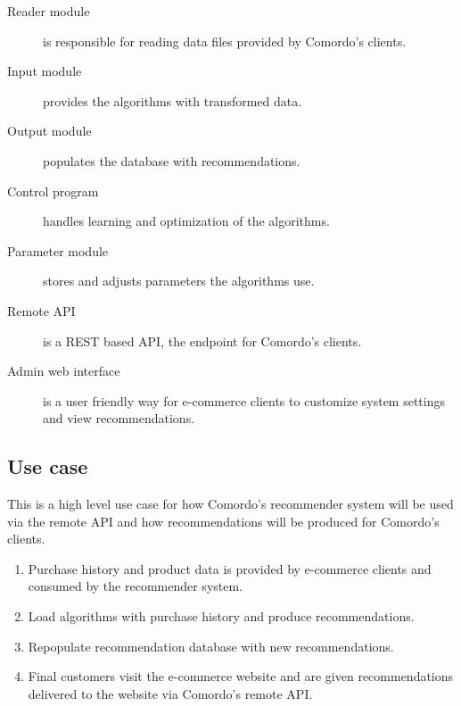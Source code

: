 \begin{description}
    \item[Reader module] is responsible for reading data files provided by Comordo's clients.
    \item[Input module] provides the algorithms with transformed data.
    \item[Output module] populates the database with recommendations.
    \item[Control program] handles learning and optimization of the algorithms.
    \item[Parameter module] stores and adjusts parameters the algorithms use.
    \item[Remote API] is a REST based API, the endpoint for Comordo's clients.
    \item[Admin web interface] is a user friendly way for e-commerce clients to customize system settings and view recommendations.
\end{description}


\subsection{Use case}\label{sec:use}

This is a high level use case for how Comordo's recommender system will be used via the remote API and how recommendations will be produced for Comordo's clients.

\begin{enumerate}
    \item Purchase history and product data is provided by e-commerce clients and consumed by the recommender system.
    \item Load algorithms with purchase history and produce recommendations.
    \item Repopulate recommendation database with new recommendations.
    \item Final customers visit the e-commerce website and are given recommendations delivered to the website via Comordo's remote API.
\end{enumerate}

